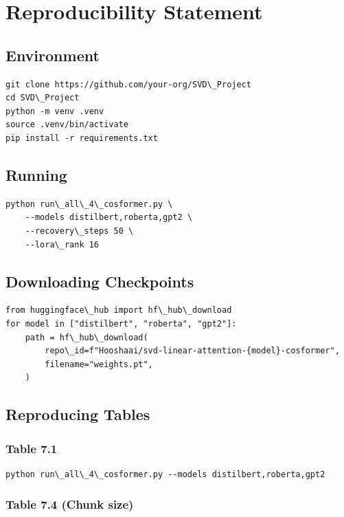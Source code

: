 
\section{Reproducibility Statement}

\subsection{Environment}

\begin{lstlisting}
git clone https://github.com/your-org/SVD\_Project
cd SVD\_Project
python -m venv .venv
source .venv/bin/activate
pip install -r requirements.txt
\end{lstlisting}

\subsection{Running}

\begin{lstlisting}
python run\_all\_4\_cosformer.py \
    --models distilbert,roberta,gpt2 \
    --recovery\_steps 50 \
    --lora\_rank 16
\end{lstlisting}

\subsection{Downloading Checkpoints}

\begin{lstlisting}
from huggingface\_hub import hf\_hub\_download
for model in ["distilbert", "roberta", "gpt2"]:
    path = hf\_hub\_download(
        repo\_id=f"Hooshaai/svd-linear-attention-{model}-cosformer",
        filename="weights.pt",
    )
\end{lstlisting}

\subsection{Reproducing Tables}

\subsubsection{Table 7.1}

\begin{lstlisting}
python run\_all\_4\_cosformer.py --models distilbert,roberta,gpt2
\end{lstlisting}

\subsubsection{Table 7.4 (Chunk size)}

